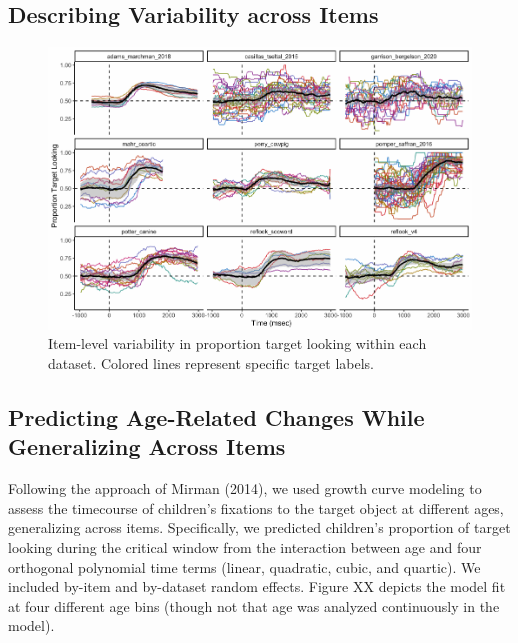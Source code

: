 \documentclass[10pt, letterpaper]{article}
\newenvironment{CodeChunk}{}{}
\begin{document}
\hypertarget{describing-variability-across-items}{%
\subsection{Describing Variability across
Items}\label{describing-variability-across-items}}

\begin{CodeChunk}
\begin{figure}[h]

{\centering \includegraphics{figs/peekbank_item_vis-1} 

}

\caption[Item-level variability in proportion target looking within each dataset]{Item-level variability in proportion target looking within each dataset. Colored lines represent specific target labels.}\label{fig:peekbank_item_vis}
\end{figure}
\end{CodeChunk}

\hypertarget{predicting-age-related-changes-while-generalizing-across-items}{%
\subsection{Predicting Age-Related Changes While Generalizing Across
Items}\label{predicting-age-related-changes-while-generalizing-across-items}}

Following the approach of Mirman (2014), we used growth curve modeling
to assess the timecourse of children's fixations to the target object at
different ages, generalizing across items. Specifically, we predicted
children's proportion of target looking during the critical window from
the interaction between age and four orthogonal polynomial time terms
(linear, quadratic, cubic, and quartic). We included by-item and
by-dataset random effects. Figure XX depicts the model fit at four
different age bins (though not that age was analyzed continuously in the
model).
\end{document}
